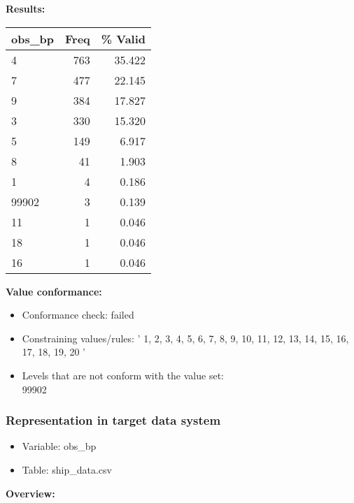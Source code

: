 \documentclass[
]{article}
\providecommand{\tightlist}{%
  \setlength{\itemsep}{0pt}\setlength{\parskip}{0pt}}
\begin{document}
\textbf{Results:}\\

\begin{table}[H]
\centering
\begin{tabular}{l|r|r}
\hline
\textbf{obs\_bp} & \textbf{Freq} & \textbf{\% Valid}\\
\hline
4 & 763 & 35.422\\
\hline
7 & 477 & 22.145\\
\hline
9 & 384 & 17.827\\
\hline
3 & 330 & 15.320\\
\hline
5 & 149 & 6.917\\
\hline
8 & 41 & 1.903\\
\hline
1 & 4 & 0.186\\
\hline
99902 & 3 & 0.139\\
\hline
11 & 1 & 0.046\\
\hline
18 & 1 & 0.046\\
\hline
16 & 1 & 0.046\\
\hline
\end{tabular}
\end{table}

\textbf{Value conformance:}

\begin{itemize}
\tightlist
\item
  Conformance check: failed
\item
  Constraining values/rules: ' 1, 2, 3, 4, 5, 6, 7, 8, 9, 10, 11, 12,
  13, 14, 15, 16, 17, 18, 19, 20 '
\item
  Levels that are not conform with the value set:\\
  99902
\end{itemize}

\newpage

\hypertarget{representation-in-target-data-system-18}{%
\subsubsection{\texorpdfstring{Representation in \textbf{target} data
system}{Representation in target data system}}\label{representation-in-target-data-system-18}}

\begin{itemize}
\tightlist
\item
  Variable: obs\_bp
\item
  Table: ship\_data.csv
\end{itemize}

\textbf{Overview:}
\end{document}

